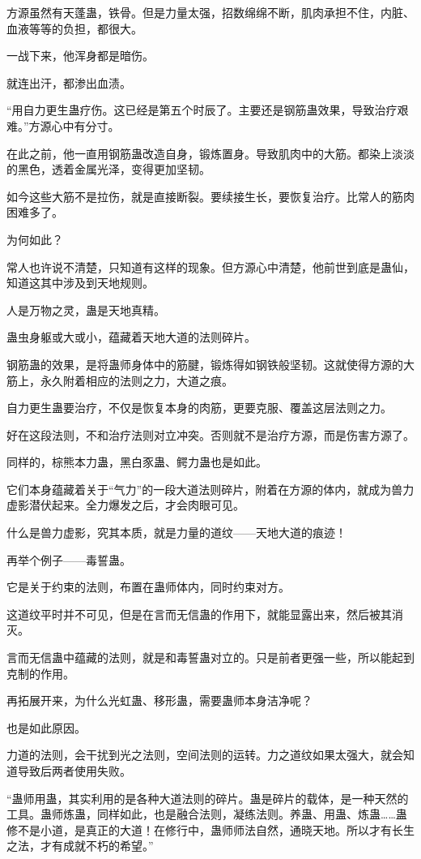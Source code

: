 \begin{this_body}
方源虽然有天蓬蛊，铁骨。但是力量太强，招数绵绵不断，肌肉承担不住，内脏、血液等等的负担，都很大。

一战下来，他浑身都是暗伤。

就连出汗，都渗出血渍。

“用自力更生蛊疗伤。这已经是第五个时辰了。主要还是钢筋蛊效果，导致治疗艰难。”方源心中有分寸。

在此之前，他一直用钢筋蛊改造自身，锻炼置身。导致肌肉中的大筋。都染上淡淡的黑色，透着金属光泽，变得更加坚韧。

如今这些大筋不是拉伤，就是直接断裂。要续接生长，要恢复治疗。比常人的筋肉困难多了。

为何如此？

常人也许说不清楚，只知道有这样的现象。但方源心中清楚，他前世到底是蛊仙，知道这其中涉及到天地规则。

人是万物之灵，蛊是天地真精。

蛊虫身躯或大或小，蕴藏着天地大道的法则碎片。

钢筋蛊的效果，是将蛊师身体中的筋腱，锻炼得如钢铁般坚韧。这就使得方源的大筋上，永久附着相应的法则之力，大道之痕。

自力更生蛊要治疗，不仅是恢复本身的肉筋，更要克服、覆盖这层法则之力。

好在这段法则，不和治疗法则对立冲突。否则就不是治疗方源，而是伤害方源了。

同样的，棕熊本力蛊，黑白豕蛊、鳄力蛊也是如此。

它们本身蕴藏着关于“气力”的一段大道法则碎片，附着在方源的体内，就成为兽力虚影潜伏起来。全力爆发之后，才会肉眼可见。

什么是兽力虚影，究其本质，就是力量的道纹——天地大道的痕迹！

再举个例子——毒誓蛊。

它是关于约束的法则，布置在蛊师体内，同时约束对方。

这道纹平时并不可见，但是在言而无信蛊的作用下，就能显露出来，然后被其消灭。

言而无信蛊中蕴藏的法则，就是和毒誓蛊对立的。只是前者更强一些，所以能起到克制的作用。

再拓展开来，为什么光虹蛊、移形蛊，需要蛊师本身洁净呢？

也是如此原因。

力道的法则，会干扰到光之法则，空间法则的运转。力之道纹如果太强大，就会知道导致后两者使用失败。

“蛊师用蛊，其实利用的是各种大道法则的碎片。蛊是碎片的载体，是一种天然的工具。蛊师炼蛊，同样如此，也是融合法则，凝练法则。养蛊、用蛊、炼蛊……蛊修不是小道，是真正的大道！在修行中，蛊师师法自然，通晓天地。所以才有长生之法，才有成就不朽的希望。”


\end{this_body}
